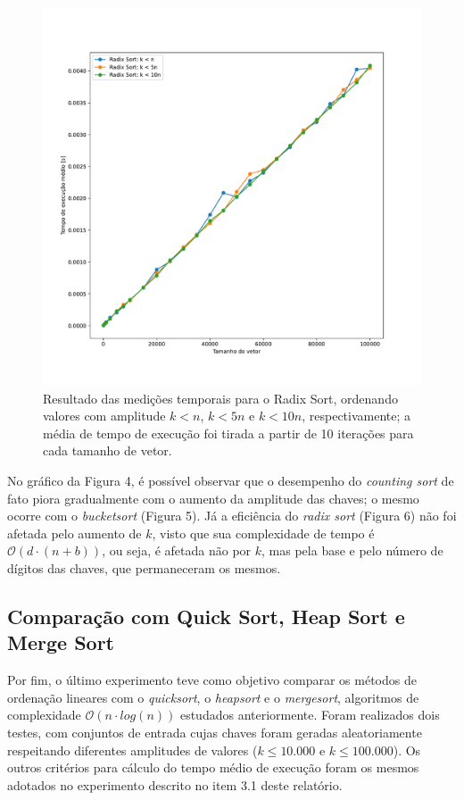 \documentclass[fontsize=10pt]{article}
\begin{document}
\begin{figure}[H]
\begin{center}
    \includegraphics[scale=0.4]{imagens/radix.pdf}
    \caption{Resultado das medições temporais para o Radix Sort, ordenando valores com amplitude $k < n$, $k < 5n$ e $k < 10n$, respectivamente; a média de tempo de execução foi tirada a partir de 10 iterações para cada tamanho de vetor.}
    \label{Figura 6}
\end{center}
\end{figure}

\quad No gráfico da Figura 4, é possível observar que o desempenho do \textit{counting sort} de fato piora gradualmente com o aumento da amplitude das chaves; o mesmo ocorre com o \textit{bucketsort} (Figura 5). Já a eficiência do \textit{radix sort} (Figura 6) não foi afetada pelo aumento de $k$, visto que sua complexidade de tempo é $\mathcal{O}(d \cdot (n + b))$, ou seja, é afetada não por $k$, mas pela base e pelo número de dígitos das chaves, que permaneceram os mesmos.

\subsection{Comparação com Quick Sort, Heap Sort e Merge Sort}

\quad Por fim, o último experimento teve como objetivo comparar os métodos de ordenação lineares com o \textit{quicksort}, o \textit{heapsort} e o \textit{mergesort}, algoritmos de complexidade $\mathcal{O}(n \cdot log(n))$ estudados anteriormente\cite{relatorio1}\cite{relatorio2}. Foram realizados dois testes, com conjuntos de entrada cujas chaves foram geradas aleatoriamente respeitando diferentes amplitudes de valores ($k \leq 10.000$ e $k \leq 100.000$). Os outros critérios para cálculo do tempo médio de execução foram os mesmos adotados no experimento descrito no item 3.1 deste relatório.
\end{document}
